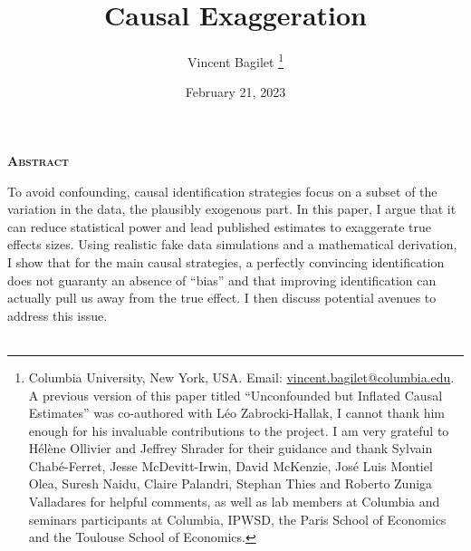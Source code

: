 \documentclass[usletter, 12pt]{article}
\begin{document}

	
	\title{Causal Exaggeration}

	\author{Vincent Bagilet
		\thanks{Columbia University, New York, USA. Email: \url{vincent.bagilet@columbia.edu}. 
			A previous version of this paper titled ``Unconfounded but Inflated Causal Estimates'' was co-authored with Léo Zabrocki-Hallak, I cannot thank him enough for his invaluable contributions to the project. I am very grateful to Hélène Ollivier and Jeffrey Shrader for their guidance and thank Sylvain Chabé-Ferret, Jesse McDevitt-Irwin, David McKenzie, José Luis Montiel Olea, Suresh Naidu, Claire Palandri, Stephan Thies and Roberto Zuniga Valladares for helpful comments, as well as lab members at Columbia and seminars participants at Columbia, IPWSD, the Paris School of Economics and the Toulouse School of Economics.}
	}
	

	\date{February 21, 2023}
	
	
	\maketitle
	
	\begin{center}
		\large \textsc{\textbf{Abstract}}\\
	\end{center}
		
		To avoid confounding, causal identification strategies focus on a subset of the variation in the data, the plausibly exogenous part. In this paper, I argue that it can reduce statistical power and lead published estimates to exaggerate true effects sizes. Using realistic fake data simulations and a mathematical derivation, I show that for the main causal strategies, a perfectly convincing identification does not guaranty an absence of ``bias'' and that improving identification can actually pull us away from the true effect. I then discuss potential avenues to address this issue.\\~\\
		
	
\end{document}
